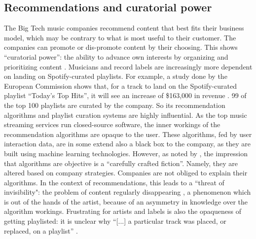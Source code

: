\subsection{Recommendations and curatorial power}
The Big Tech music companies recommend content that best fits their business model, which may be contrary to what is most useful to their customer. The companies can promote or dis-promote content by their choosing. This shows ``curatorial power'': the ability to advance own interests by organizing and prioritizing content \citep{prey2020locating}. Musicians and record labels are increasingly more dependent on landing on Spotify-curated playlists. For example, a study done by the European Commission shows that, for a track to land on the Spotify-curated playlist ``Today's Top Hits'', it will see an increase of \$163,000 in revenue \citep{aguiar2018platforms}. 99 of the top 100 playlists are curated by the company. So its recommendation algorithms and playlist curation systems are highly influential. As the top music streaming services run closed-source software, the inner workings of the recommendation algorithms are opaque to the user. These algorithms, fed by user interaction data, are in some extend also a black box to the company, as they are built using machine learning technologies. However, as noted by \citep{gillespie2014relevance}, the impression that algorithms are objective is a ``carefully crafted fiction''. Namely, they are altered based on company strategies. Companies are not obliged to explain their algorithms. In the context of recommendations, this leads to a ``threat of invisibility": the problem of content regularly disappearing \citep{bucher2018if}, a phenomenon which is out of the hands of the artist, because of an asymmetry in knowledge over the algorithm workings. Frustrating for artists and labels is also the opaqueness of getting playlisted: it is unclear why ``[...] a particular track was placed, or replaced, on a playlist'' \citep{prey2020locating}.
